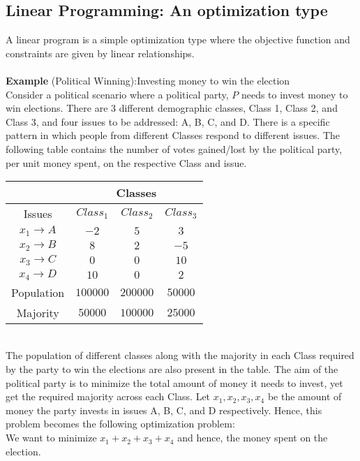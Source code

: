 \documentclass[twoside]{article}
\begin{document}
\subsection{Linear Programming: An optimization type}
A linear program is a simple optimization type where the objective function and constraints are given by linear relationships.\\\\
\textbf{Example} (Political Winning):Investing money to win the election
\\Consider a political scenario where a political party, $P$ needs to invest money to win elections. There are 3 different demographic classes, Class 1, Class 2, and Class 3, and four issues to be addressed: A, B, C, and D.  There is a specific pattern in which people from different Classes respond to different issues. The following table contains the number of votes gained/lost by the political party, per unit money spent, on the respective Class and issue.
\begin{table}[htbp]
  \centering
  \begin{tabular}{|c|c|c|c|}
    \hline
    \multicolumn{1}{|c|}{} & \multicolumn{3}{c|}{Classes} \\
    \hline
    Issues & $Class_1$ & $Class_2$ & $Class_3$  \\
    \hline
    $x_1 \rightarrow A $ & $-2$ & $5$ & $3$  \\
    \hline
    $x_2 \rightarrow B $ & $8$ & $2$ & $-5$  \\
    \hline
    $x_3 \rightarrow C $ & $0$ & $0$ & $10$  \\
    \hline
    $x_4 \rightarrow D $ & $10$ & $0$ & $2$ \\
    \hline
    Population & $100000$ & $200000$ & $50000$\\
    \hline
    Majority & $50000$ & $100000$ & $25000$\\
    \hline
  \end{tabular}
  \label{tab:election_grid}
\end{table}
\\The population of different classes along with the majority in each Class required by the party to win the elections are also present in the table. The aim of the political party is to minimize the total amount of money it needs to invest, yet get the required majority across each Class. Let $x_1, x_2,x_3,x_4$ be the amount of money the party invests in issues A, B, C, and D respectively. Hence, this problem becomes the following optimization problem:
\\We want to minimize $x_1+x_2+x_3+x_4$ and hence, the money spent on the election.
\end{document}
